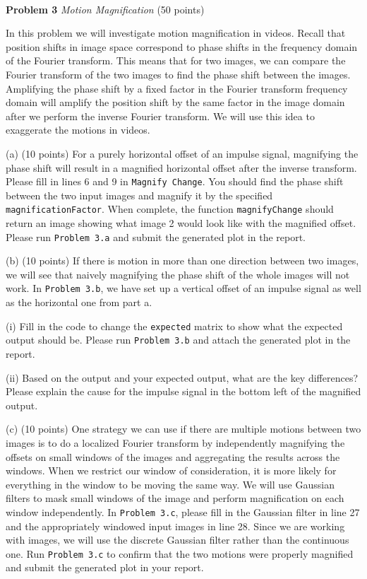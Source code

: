 \documentclass[11pt]{article}
\newcommand{\hwproblem}[2] {\noindent \\ {\bf #1} {\it #2}}
\begin{document}
\hwproblem{Problem 3}{Motion Magnification} (50 points)

In this problem we will investigate motion magnification in videos. Recall that position shifts in image space correspond to phase shifts in the frequency domain of the Fourier transform. This means that for two images, we can compare the Fourier transform of the two images to find the phase shift between the images. Amplifying the phase shift by a fixed factor in the Fourier transform frequency domain will amplify the position shift by the same factor in the image domain after we perform the inverse Fourier transform. We will use this idea to exaggerate the motions in videos.

(a) (10 points) For a purely horizontal offset of an impulse signal, magnifying the phase shift will result in a magnified horizontal offset after the inverse transform. Please fill in lines 6 and 9 in \texttt{Magnify Change}. You should find the phase shift between the two input images and magnify it by the specified \texttt{magnificationFactor}. When complete, the function \texttt{magnifyChange} should return an image showing what image 2 would look like with the magnified offset. Please run \texttt{Problem 3.a} and submit the generated plot in the report.

(b) (10 points) If there is motion in more than one direction between two images, we will see that naively magnifying the phase shift of the whole images will not work. In \texttt{Problem 3.b}, we have set up a vertical offset of an impulse signal as well as the horizontal one from part a. 

(i) Fill in the code to change the \texttt{expected} matrix to show what the expected output should be. Please run \texttt{Problem 3.b} and attach the generated plot in the report.

(ii) Based on the output and your expected output, what are the key differences? Please explain the cause for the impulse signal in the bottom left of the magnified output.

(c) (10 points) One strategy we can use if there are multiple motions between two images is to do a localized Fourier transform by independently magnifying the offsets on small windows of the images and aggregating the results across the windows. When we restrict our window of consideration, it is more likely for everything in the window to be moving the same way. We will use Gaussian filters to mask small windows of the image and perform magnification on each window independently. In \texttt{Problem 3.c}, please fill in the Gaussian filter in line 27 and the appropriately windowed input images in line 28. Since we are working with images, we will use the discrete Gaussian filter rather than the continuous one. Run \texttt{Problem 3.c} to confirm that the two motions were properly magnified and submit the generated plot in your report.
\end{document}
